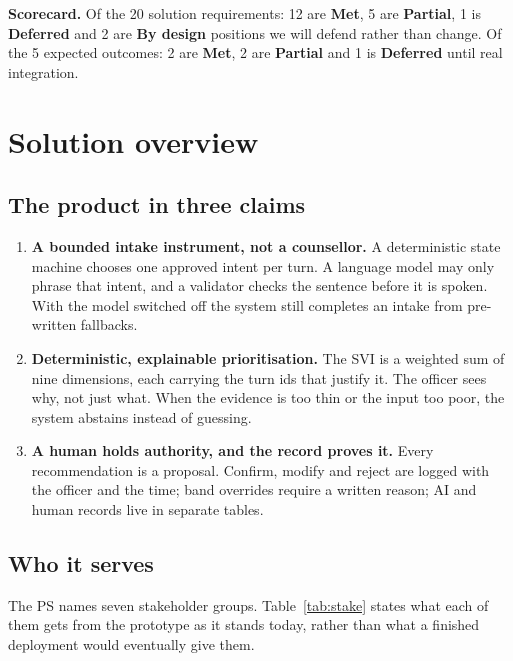 \documentclass[11pt,a4paper]{article}
\newcommand{\yes}{\textcolor{sahaygreen}{\textbf{Met}}}
\newcommand{\partly}{\textcolor{sahayorange}{\textbf{Partial}}}
\newcommand{\defer}{\textcolor{sahaygray}{\textbf{Deferred}}}
\newcommand{\bydesign}{\textcolor{sahaypurple}{\textbf{By design}}}
\begin{document}
\noindent\textbf{Scorecard.} Of the 20 solution requirements: 12 are \yes, 5 are \partly, 1 is
\defer{} and 2 are \bydesign{} positions we will defend rather than change. Of the 5 expected
outcomes: 2 are \yes, 2 are \partly{} and 1 is \defer{} until real integration.

\section{Solution overview}
\label{sec:solution}

\subsection{The product in three claims}
\begin{enumerate}
  \item \textbf{A bounded intake instrument, not a counsellor.} A deterministic state machine
        chooses one approved intent per turn. A language model may only phrase that intent, and a
        validator checks the sentence before it is spoken. With the model switched off the system
        still completes an intake from pre-written fallbacks.
  \item \textbf{Deterministic, explainable prioritisation.} The SVI is a weighted sum of nine
        dimensions, each carrying the turn ids that justify it. The officer sees why, not just what.
        When the evidence is too thin or the input too poor, the system abstains instead of guessing.
  \item \textbf{A human holds authority, and the record proves it.} Every recommendation is a
        proposal. Confirm, modify and reject are logged with the officer and the time; band overrides
        require a written reason; AI and human records live in separate tables.
\end{enumerate}

\subsection{Who it serves}
The PS names seven stakeholder groups. Table~\ref{tab:stake} states what each of them gets from the
prototype as it stands today, rather than what a finished deployment would eventually give them.
\end{document}
